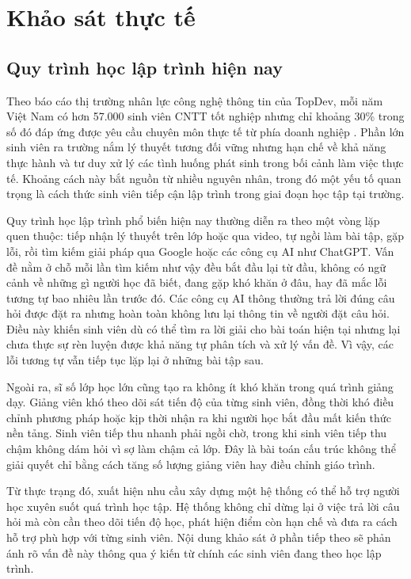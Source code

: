 \documentclass[../main.tex]{subfiles}
\begin{document}
\section{Khảo sát thực tế}

\subsection{Quy trình học lập trình hiện nay}

Theo báo cáo thị trường nhân lực công nghệ thông tin của TopDev, mỗi năm Việt Nam có hơn 57.000 sinh viên CNTT tốt nghiệp nhưng chỉ khoảng 30\% trong số đó đáp ứng được yêu cầu chuyên môn thực tế từ phía doanh nghiệp \cite{topdev2023baocao}. Phần lớn sinh viên ra trường nắm lý thuyết tương đối vững nhưng hạn chế về khả năng thực hành và tư duy xử lý các tình huống phát sinh trong bối cảnh làm việc thực tế. Khoảng cách này bắt nguồn từ nhiều nguyên nhân, trong đó một yếu tố quan trọng là cách thức sinh viên tiếp cận lập trình trong giai đoạn học tập tại trường.

Quy trình học lập trình phổ biến hiện nay thường diễn ra theo một vòng lặp quen thuộc: tiếp nhận lý thuyết trên lớp hoặc qua video, tự ngồi làm bài tập, gặp lỗi, rồi tìm kiếm giải pháp qua Google hoặc các công cụ AI như ChatGPT. Vấn đề nằm ở chỗ mỗi lần tìm kiếm như vậy đều bắt đầu lại từ đầu, không có ngữ cảnh về những gì người học đã biết, đang gặp khó khăn ở đâu, hay đã mắc lỗi tương tự bao nhiêu lần trước đó. Các công cụ AI thông thường trả lời đúng câu hỏi được đặt ra nhưng hoàn toàn không lưu lại thông tin về người đặt câu hỏi. Điều này khiến sinh viên dù có thể tìm ra lời giải cho bài toán hiện tại nhưng lại chưa thực sự rèn luyện được khả năng tự phân tích và xử lý vấn đề. Vì vậy, các lỗi tương tự vẫn tiếp tục lặp lại ở những bài tập sau.

Ngoài ra, sĩ số lớp học lớn cũng tạo ra không ít khó khăn trong quá trình giảng dạy. Giảng viên khó theo dõi sát tiến độ của từng sinh viên, đồng thời khó điều chỉnh phương pháp hoặc kịp thời nhận ra khi người học bắt đầu mất kiến thức nền tảng. Sinh viên tiếp thu nhanh phải ngồi chờ, trong khi sinh viên tiếp thu chậm không dám hỏi vì sợ làm chậm cả lớp. Đây là bài toán cấu trúc không thể giải quyết chỉ bằng cách tăng số lượng giảng viên hay điều chỉnh giáo trình.

Từ thực trạng đó, xuất hiện nhu cầu xây dựng một hệ thống có thể hỗ trợ người học xuyên suốt quá trình học tập. Hệ thống không chỉ dừng lại ở việc trả lời câu hỏi mà còn cần theo dõi tiến độ học, phát hiện điểm còn hạn chế và đưa ra cách hỗ trợ phù hợp với từng sinh viên. Nội dung khảo sát ở phần tiếp theo sẽ phản ánh rõ vấn đề này thông qua ý kiến từ chính các sinh viên đang theo học lập trình.
\end{document}
